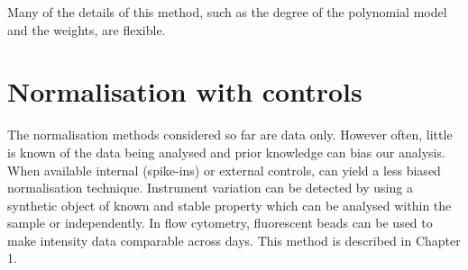 Many of the details of this method, such as the degree of the polynomial model and the weights, are flexible.


%



\section{Normalisation with controls}

The normalisation methods considered so far are data only.
However often, little is known of the data being analysed and prior knowledge can bias our analysis.
When available internal (spike-ins) or external controls, can yield a less biased normalisation technique.
Instrument variation can be detected by using a synthetic object of known and stable property which can be analysed within the sample
or independently.
In flow cytometry, fluorescent beads can be used to make intensity data comparable across days.
This method is described in Chapter 1.


